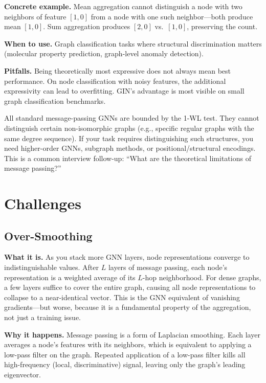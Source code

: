 \textbf{Concrete example.} Mean aggregation cannot distinguish a node with two neighbors of feature $[1, 0]$ from a node with one such neighbor---both produce mean $[1, 0]$. Sum aggregation produces $[2, 0]$ vs.\ $[1, 0]$, preserving the count.

\textbf{When to use.} Graph classification tasks where structural discrimination matters (molecular property prediction, graph-level anomaly detection).

\textbf{Pitfalls.} Being theoretically most expressive does not always mean best performance. On node classification with noisy features, the additional expressivity can lead to overfitting. GIN's advantage is most visible on small graph classification benchmarks.

\begin{warningbox}
All standard message-passing GNNs are bounded by the 1-WL test. They cannot distinguish certain non-isomorphic graphs (e.g., specific regular graphs with the same degree sequence). If your task requires distinguishing such structures, you need higher-order GNNs, subgraph methods, or positional/structural encodings. This is a common interview follow-up: ``What are the theoretical limitations of message passing?''
\end{warningbox}

\section{Challenges}
\label{sec:gnn_challenges}

\subsection{Over-Smoothing}

\textbf{What it is.} As you stack more GNN layers, node representations converge to indistinguishable values. After $L$ layers of message passing, each node's representation is a weighted average of its $L$-hop neighborhood. For dense graphs, a few layers suffice to cover the entire graph, causing all node representations to collapse to a near-identical vector. This is the GNN equivalent of vanishing gradients---but worse, because it is a fundamental property of the aggregation, not just a training issue.

\textbf{Why it happens.} Message passing is a form of Laplacian smoothing. Each layer averages a node's features with its neighbors, which is equivalent to applying a low-pass filter on the graph. Repeated application of a low-pass filter kills all high-frequency (local, discriminative) signal, leaving only the graph's leading eigenvector.

